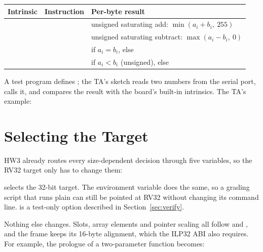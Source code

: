 \documentclass[12pt]{article}
\begin{document}
\begin{center}
\begin{tabularx}{\linewidth}{@{}llL@{}}
\toprule
Intrinsic & Instruction & Per-byte result \\
\midrule
{} &  & unsigned saturating add: $\min(a_i + b_i,\ 255)$ \\
 &  & unsigned saturating subtract: $\max(a_i - b_i,\ 0)$ \\
 &  &  if $a_i = b_i$, else  \\
 &  &  if $a_i < b_i$ (unsigned), else  \\
\bottomrule
\end{tabularx}
\end{center}

A test program defines ; the TA's sketch
 reads two numbers from the serial port, calls it, and compares the result with
the board's built-in intrinsics. The TA's example:



\section{Selecting the Target}

HW3 already routes every size-dependent decision through five variables, so the RV32 target only has
to change them:


 selects the 32-bit target. The environment variable  does the
same, so a grading script that runs plain  can still be pointed at RV32 without
changing its command line.  is a test-only option described in
Section~\ref{sec:verify}.

Nothing else changes. Slots, array elements and pointer scaling all follow  and , and
the frame keeps its 16-byte alignment, which the ILP32 ABI also requires. For example, the prologue of a
two-parameter function becomes:
\end{document}
